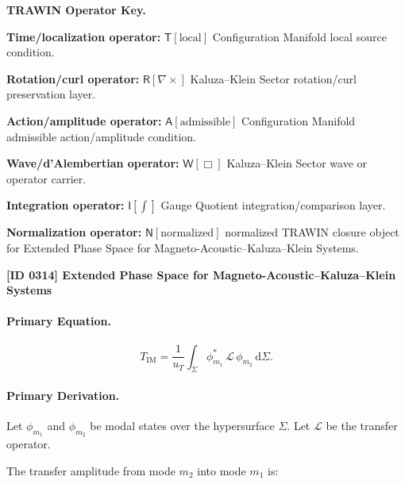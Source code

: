 \par\vspace{0.45\baselineskip}
\noindent\begin{minipage}[t]{\linewidth}
\begingroup
\small
\raggedright
\textbf{TRAWIN Operator Key.}\par
\noindent\textbf{Time/localization operator:} $\mathsf{T}\!\left[\mathrm{local}\right]$ Configuration Manifold local source condition.\par
\noindent\textbf{Rotation/curl operator:} $\mathsf{R}\!\left[\nabla\times\right]$ Kaluza--Klein Sector rotation/curl preservation layer.\par
\noindent\textbf{Action/amplitude operator:} $\mathsf{A}\!\left[\mathrm{admissible}\right]$ Configuration Manifold admissible action/amplitude condition.\par
\noindent\textbf{Wave/d'Alembertian operator:} $\mathsf{W}\!\left[\Box\right]$ Kaluza--Klein Sector wave or operator carrier.\par
\noindent\textbf{Integration operator:} $\mathsf{I}\!\left[\int\right]$ Gauge Quotient integration/comparison layer.\par
\noindent\textbf{Normalization operator:} $\mathsf{N}\!\left[\mathrm{normalized}\right]$ normalized TRAWIN closure object for Extended Phase Space for Magneto-Acoustic--Kaluza--Klein Systems.\par
\endgroup
\end{minipage}

\clearpage
\noindent\textbf{[ID 0314] Extended Phase Space for Magneto-Acoustic--Kaluza--Klein Systems}\par
\vspace{0.35em}
\paragraph{Primary Equation.}
\begin{equation}
T_{\mathrm{IM}}
=
\frac{1}{u_T}
\int_{\Sigma}
\phi_{m_1}^{*}
\,\mathcal{L}\,
\phi_{m_2}
\,\mathrm{d}\Sigma .
\end{equation}

\paragraph{Primary Derivation.}
Let $\phi_{m_1}$ and $\phi_{m_2}$ be modal states over the hypersurface $\Sigma$.  
Let $\mathcal{L}$ be the transfer operator.

The transfer amplitude from mode $m_2$ into mode $m_1$ is:

